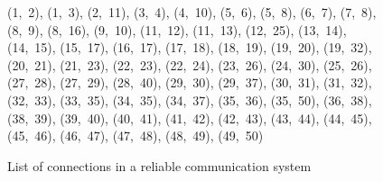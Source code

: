 \begin{enumerate}[(a)]
\begin{figure}[H]
	\centering
	\begin{multicols}{5}
(1,~2), (1,~3), (2,~11), (3,~4), (4,~10), (5,~6), (5,~8), (6,~7), (7,~8), (8,~9), (8,~16), (9,~10), (11,~12), (11,~13), (12,~25), (13,~14), (14,~15), (15,~17), (16,~17), (17,~18), (18,~19), (19,~20), (19,~32), (20,~21), (21,~23), (22,~23), (22,~24), (23,~26), (24,~30), (25,~26), (27,~28), (27,~29), (28,~40), (29,~30), (29,~37), (30,~31), (31,~32), (32,~33), (33,~35), (34,~35), (34,~37), (35,~36), (35,~50), (36,~38), (38,~39), (39,~40), (40,~41), (41,~42), (42,~43), (43,~44), (44,~45), (45,~46), (46,~47), (47,~48), (48,~49), (49,~50)
	\end{multicols}
	\caption{List of connections in a reliable communication system}
	\label{reliable1}
\end{figure}


\end{enumerate}